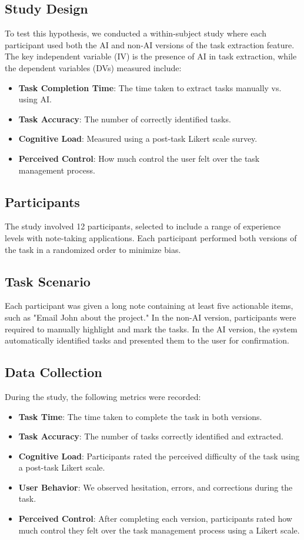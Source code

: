 \documentclass[a4paper, 12pt]{article}
\begin{document}
\subsection{Study Design}
To test this hypothesis, we conducted a within-subject study where each participant used both the AI and non-AI versions of the task extraction feature. The key independent variable (IV) is the presence of AI in task extraction, while the dependent variables (DVs) measured include:
\begin{itemize}
    \item \textbf{Task Completion Time}: The time taken to extract tasks manually vs. using AI.
    \item \textbf{Task Accuracy}: The number of correctly identified tasks.
    \item \textbf{Cognitive Load}: Measured using a post-task Likert scale survey.
    \item \textbf{Perceived Control}: How much control the user felt over the task management process.
\end{itemize}

\subsection{Participants}
The study involved 12 participants, selected to include a range of experience levels with note-taking applications. Each participant performed both versions of the task in a randomized order to minimize bias.

\subsection{Task Scenario}
Each participant was given a long note containing at least five actionable items, such as "Email John about the project." In the non-AI version, participants were required to manually highlight and mark the tasks. In the AI version, the system automatically identified tasks and presented them to the user for confirmation.

\subsection{Data Collection}
During the study, the following metrics were recorded:
\begin{itemize}
    \item \textbf{Task Time}: The time taken to complete the task in both versions.
    \item \textbf{Task Accuracy}: The number of tasks correctly identified and extracted.
    \item \textbf{Cognitive Load}: Participants rated the perceived difficulty of the task using a post-task Likert scale.
    \item \textbf{User Behavior}: We observed hesitation, errors, and corrections during the task.
    \item \textbf{Perceived Control}: After completing each version, participants rated how much control they felt over the task management process using a Likert scale.
\end{itemize}
\end{document}
